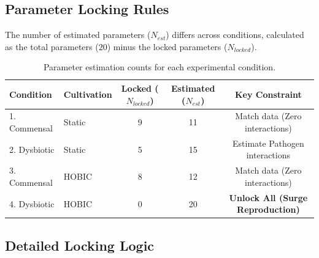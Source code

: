 \documentclass[11pt,a4paper]{article}
\begin{document}
\subsection{Parameter Locking Rules}

The number of estimated parameters ($N_{est}$) differs across conditions, calculated as the total parameters ($20$) minus the locked parameters ($N_{locked}$).

\begin{table}[h]
\centering
\small
\begin{tabular}{llccc}
\toprule
\textbf{Condition} & \textbf{Cultivation} & \textbf{Locked ($N_{locked}$)} & \textbf{Estimated ($N_{est}$)} & \textbf{Key Constraint} \\
\midrule
1. Commensal & Static & 9 & 11 & Match data (Zero interactions) \\
2. Dysbiotic & Static & 5 & 15 & Estimate Pathogen interactions \\
3. Commensal & HOBIC & 8 & 12 & Match data (Zero interactions) \\
4. Dysbiotic & HOBIC & 0 & 20 & \textbf{Unlock All (Surge Reproduction)} \\
\bottomrule
\end{tabular}
\caption{Parameter estimation counts for each experimental condition.}
\label{tab:conditions}
\end{table}

\subsection{Detailed Locking Logic}
\end{document}
